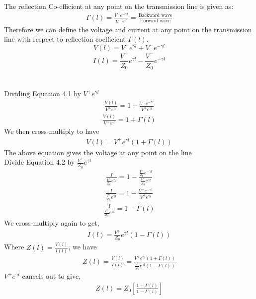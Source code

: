 The reflection Co-efficient at any point on the transmission line is given as:
\begin{align*}
\Gamma{(l)} = \frac{V^-e^{-\gamma l}}{V^+e^{\gamma l}} = \frac{\text{Backward wave}}{\text{Forward wave}}
\end{align*}
Therefore we can define the voltage and current at any point on the transmission line with respect to reflection coefficient $\Gamma(l)$.
\begin{equation}
V(l) = V^+e^{\gamma l} + V^-e^{-\gamma l}
\end{equation}
\begin{equation}
I(l) =\frac{V^+}{Z_0} e^{\gamma l} - \frac{V^-}{Z_0}e^{-\gamma l}
\end{equation}\\\\
Dividing Equation 4.1 by $V^+e^{\gamma l}$
\begin{align*}
\frac{V(l)}{ V^+e^{\gamma l}} = 1 + \frac{ V^-e^{-\gamma l}}{ V^+e^{\gamma l}}
\end{align*}
\begin{align*}
\frac{V(l)}{ V^+e^{\gamma l}} = 1 + \Gamma(l)
\end{align*}
We then cross-multiply to have
\begin{align*}
V(l) = V^+e^{\gamma l} (1 + \Gamma(l))
\end{align*}
The above equation gives the voltage at any point on the line\\
Divide Equation 4.2 by $\frac{V^+}{Z_0} e^{\gamma l}$
\begin{align*}
\frac{I}{\frac{V^+}{Z_0} e^{\gamma l}} = 1 - \frac{\frac{V^-}{Z_0} e^{-\gamma l}}{\frac{V^+}{Z_0} e^{\gamma l}}
\end{align*}
\begin{align*}
\frac{I}{\frac{V^+}{Z_0} e^{\gamma l}}= 1 - \frac{V^-e^{-\gamma l}}{V^+e^{\gamma l}}
\end{align*}
\begin{align*}
\frac{I}{\frac{V^+}{Z_0} e^{\gamma l}} = 1 - \Gamma(l)
\end{align*}
We cross-multiply again to get,
\begin{align*}
I(l) = \frac{V^+}{Z_0} e^{\gamma l} (1 - \Gamma(l))
\end{align*}
Where $Z(l) = \frac{V(l)}{I(l)}$, we have
\begin{align*}
Z(l) = \frac{V(l)}{I(l)} = \frac{V^+e^{\gamma l} (1 + \Gamma(l))}{ \frac{V^+}{Z_0} e^{\gamma l} (1 - \Gamma(l))}
\end{align*}
$V^+ e^{\gamma l}$ cancels out to give,
\begin{align}
Z(l) = Z_0[\frac{1 + \Gamma(l)}{1 - \Gamma(l)}]
\end{align}

